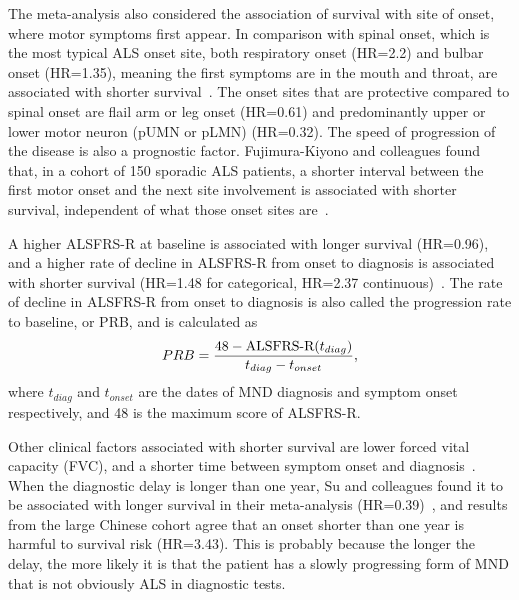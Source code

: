 The meta-analysis also considered the association of survival with site of onset, where motor symptoms first appear.
In comparison with spinal onset, which is the most typical ALS onset site, both respiratory onset (HR=2.2) and bulbar onset (HR=1.35), meaning the first symptoms are in the mouth and throat, are associated with shorter survival~\cite{suPredictorsSurvivalPatients2021}.
The onset sites that are protective compared to spinal onset are flail arm or leg onset (HR=0.61) and predominantly upper or lower motor neuron (pUMN or pLMN) (HR=0.32).
The speed of progression of the disease is also a prognostic factor. Fujimura-Kiyono and colleagues found that, in a cohort of 150 sporadic ALS patients, a shorter interval between the first motor onset and the next site involvement is associated with shorter survival, independent of what those onset sites are~\cite{fujimura-kiyonoOnsetSpreadingPatterns2011a}.

A higher ALSFRS-R at baseline is associated with longer survival (HR=0.96), and a higher rate of decline in ALSFRS-R from onset to diagnosis is associated with shorter survival (HR=1.48 for categorical, HR=2.37 continuous)~\cite{suPredictorsSurvivalPatients2021}.
The rate of decline in ALSFRS-R from onset to diagnosis is also called the progression rate to baseline, or PRB, and is calculated as
\begin{equation}
    PRB = \frac{48-\textnormal{ALSFRS-R}(t_{diag})}{t_{diag}-t_{onset}},
\end{equation}\label{eq:PRB}
where $t_{diag}$ and $t_{onset}$ are the dates of MND diagnosis and symptom onset respectively, and 48 is the maximum score of ALSFRS-R.

Other clinical factors associated with shorter survival are lower forced vital capacity (FVC), and a shorter time between symptom onset and diagnosis~\cite{suPredictorsSurvivalPatients2021}.
When the diagnostic delay is longer than one year, Su and colleagues found it to be associated with longer survival in their meta-analysis (HR=0.39)~\cite{suPredictorsSurvivalPatients2021}, and results from the large Chinese cohort agree that an onset shorter than one year is harmful to survival risk (HR=3.43).
This is probably because the longer the delay, the more likely it is that the patient has a slowly progressing form of MND that is not obviously ALS in diagnostic tests.

